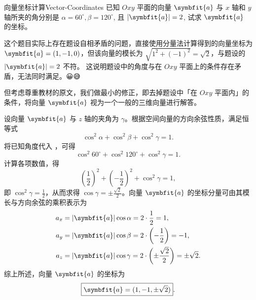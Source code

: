 \begin{problem}{向量坐标计算}{Vector-Coordinates}
    已知 $Oxy$ 平面的向量 $\symbfit{a}$ 与 $x$ 轴和 $y$ 轴所夹的角分别是 $\alpha = 60^\circ, \beta = 120^\circ$, 且 $|\symbfit{a}| = 2$, 试求 $\symbfit{a}$ 的坐标。
\end{problem}

\begin{note}{}{}
    这个题目实际上存在题设自相矛盾的问题，直接使用分量法计算得到的向量坐标为 $\symbfit{a} = (1, -1, 0)$，但该向量的模长为 $\sqrt{1^2 + (-1)^2} = \sqrt{2}$，与题设的 $|\symbfit{a}| = 2$ 不符。
    这说明题设中的角度与在 $Oxy$ 平面上的条件存在矛盾，无法同时满足。{\emojifont 😀😅}

    但考虑尊重教材的原文，我们做最小的修正，即去掉题设中「在 $Oxy$ 平面内」的条件，将向量 $\symbfit{a}$ 视为一个一般的三维向量进行解答。
\end{note}

\begin{solution}
    设向量 $\symbfit{a}$ 与 $z$ 轴的夹角为 $\gamma$。根据空间向量的方向余弦性质，满足恒等式
    \begin{equation}
        \cos^2 \alpha + \cos^2 \beta + \cos^2 \gamma = 1. \label{eq:direction-cosine-1}
    \end{equation}
    将已知角度代入 ，可得
    \begin{equation}
        \cos^2 60^\circ + \cos^2 120^\circ + \cos^2 \gamma = 1.
    \end{equation}
    计算各项数值，得
    \begin{equation}
        \left( \frac{1}{2} \right)^2 + \left( -\frac{1}{2} \right)^2 + \cos^2 \gamma = 1,
    \end{equation}
    即 $\cos^2 \gamma = \frac{1}{2}$，从而求得 $\cos \gamma = \pm \frac{\sqrt{2}}{2}$。向量 $\symbfit{a}$ 的坐标分量可由其模长与方向余弦的乘积表示为
    \begin{equation}
        \begin{aligned}
            a_x & = |\symbfit{a}| \cos \alpha = 2 \cdot \frac{1}{2} = 1,                                      \\
            a_y & = |\symbfit{a}| \cos \beta = 2 \cdot \left( -\frac{1}{2} \right) = -1,                      \\
            a_z & = |\symbfit{a}| \cos \gamma = 2 \cdot \left( \pm \frac{\sqrt{2}}{2} \right) = \pm \sqrt{2}.
        \end{aligned}
    \end{equation}
    综上所述，向量 $\symbfit{a}$ 的坐标为
    \begin{equation}
        \boxed{\symbfit{a} = (1, -1, \pm \sqrt{2})}.
    \end{equation}
\end{solution}


